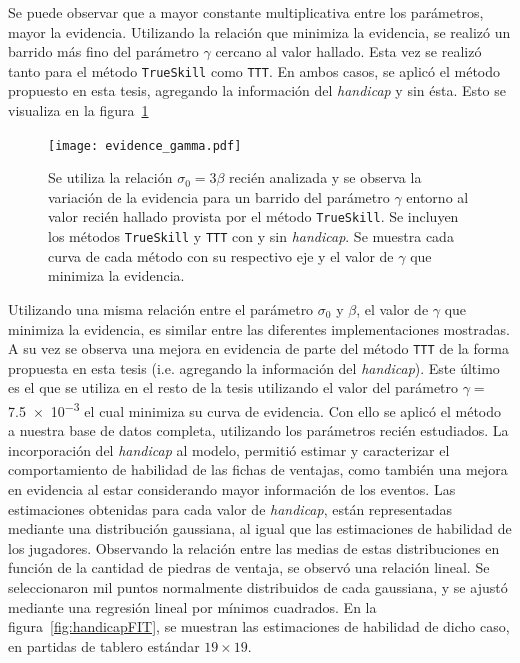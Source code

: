 \documentclass[11pt,twoside,spanish]{report} %
\begin{document}
Se puede observar que a mayor constante multiplicativa entre los par\'ametros, mayor la evidencia.
Utilizando la relaci\'on que minimiza la evidencia, se realiz\'o un barrido m\'as fino del par\'ametro $\gamma$  cercano al valor hallado.
Esta vez se realiz\'o tanto para el m\'etodo \texttt{TrueSkill} como \texttt{TTT}.
En ambos casos, se aplic\'o el m\'etodo propuesto en esta tesis, agregando la informaci\'on del \textit{handicap} y sin \'esta.
Esto se visualiza en la figura~\ref{fig:tttBetaSigma}

\begin{figure}[H]
	\centering
	\texttt{[image: evidence\_gamma.pdf]}
	\caption{Se utiliza la relaci\'on   $\sigma_0 = 3 \beta$ reci\'en analizada y se observa la variaci\'on de la evidencia para un barrido del par\'ametro $\gamma$ entorno al valor reci\'en hallado provista por el m\'etodo \texttt{TrueSkill}. Se incluyen los m\'etodos \texttt{TrueSkill} y \texttt{TTT} con y sin \textit{handicap}. Se muestra cada curva de cada m\'etodo con su respectivo eje y el valor de $\gamma$ que minimiza la evidencia.}
	\label{fig:tttBetaSigma}
\end{figure}



Utilizando una misma relaci\'on entre el par\'ametro $\sigma_0$ y $\beta$, el valor de $\gamma$ que minimiza la evidencia, es similar entre las diferentes implementaciones mostradas.
A su vez se observa una mejora en evidencia de parte del m\'etodo \texttt{TTT} de la forma propuesta en esta tesis (i.e. agregando la informaci\'on del \textit{handicap}).
Este \'ultimo es el que se utiliza en el resto de la tesis utilizando el valor del par\'ametro $\gamma= $\num{7.5e-3}  el cual minimiza su curva de evidencia.
Con ello se aplic\'o el m\'etodo a nuestra base de datos completa,  utilizando los par\'ametros reci\'en estudiados. 
La incorporaci\'on del \textit{handicap} al modelo, permiti\'o estimar y caracterizar el comportamiento de habilidad de las fichas de ventajas, como tambi\'en una mejora en evidencia al estar considerando mayor informaci\'on de los eventos.
Las estimaciones obtenidas para cada valor de \textit{handicap}, est\'an representadas mediante una distribuci\'on gaussiana, al igual que las estimaciones de habilidad de los jugadores.
Observando la relaci\'on entre las medias de estas distribuciones en funci\'on de la cantidad de piedras de ventaja, se observ\'o una relaci\'on lineal.
Se seleccionaron mil puntos normalmente distribuidos de cada gaussiana, y se ajust\'o mediante una regresi\'on lineal por m\'inimos cuadrados.
En la figura~\ref{fig:handicapFIT}, se muestran las estimaciones de habilidad de dicho caso, en partidas de tablero est\'andar $19\times 19$.
\end{document}
